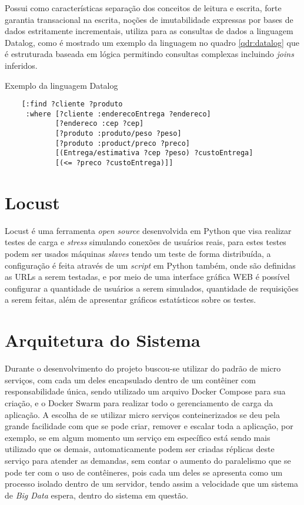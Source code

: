 Possui como características separação dos conceitos de leitura e escrita, forte garantia transacional na escrita, noções de imutabilidade expressas por bases de dados estritamente incrementais, utiliza para as consultas de dados a linguagem Datalog, como é mostrado um exemplo da linguagem no quadro \ref{qdr:datalog} que é estruturada baseada em lógica permitindo consultas complexas incluindo \textit{joins} inferidos.~\cite{datomic} 

\begin{quadro}
\caption{\label{qdr:datalog} Exemplo da linguagem Datalog}
\begin{lstlisting}
	[:find ?cliente ?produto
	 :where [?cliente :enderecoEntrega ?endereco]
	        [?endereco :cep ?cep]
	        [?produto :produto/peso ?peso]
	        [?produto :product/preco ?preco]
	        [(Entrega/estimativa ?cep ?peso) ?custoEntrega]
	        [(<= ?preco ?custoEntrega)]]
\end{lstlisting}
\end{quadro}

\section{Locust}
Locust é uma ferramenta \textit{open source} desenvolvida em Python que visa realizar testes de carga e \textit{stress} simulando conexões de usuários reais, para estes testes podem ser usados máquinas \textit{slaves} tendo um teste de forma distribuída, a configuração é feita através de um \textit{script} em Python também, onde são definidas as URLs a serem testadas, e por meio de uma interface gráfica WEB é possível configurar a quantidade de usuários a serem simulados, quantidade de requisições a serem feitas, além de apresentar gráficos estatísticos sobre os testes.~\cite{locust}

\section{Arquitetura do Sistema}
Durante o desenvolvimento do projeto buscou-se utilizar do padrão de micro serviços, com cada um deles encapsulado dentro de um contêiner com responsabilidade única, sendo utilizado um arquivo Docker Compose para sua criação, e o Docker Swarm para realizar todo o gerenciamento de carga da aplicação. A escolha de se utilizar micro serviços conteinerizados se deu pela grande facilidade com que se pode criar, remover e escalar toda a aplicação, por exemplo, se em algum momento um serviço em específico está sendo mais utilizado que os demais, automaticamente podem ser criadas réplicas deste serviço para atender as demandas, sem contar o aumento do paralelismo que se pode ter com o uso de contêineres, pois cada um deles se apresenta como um processo isolado dentro de um servidor, tendo assim a velocidade que um sistema de \textit{Big Data} espera, dentro do sistema em questão.~\cite{dockerswarm}

